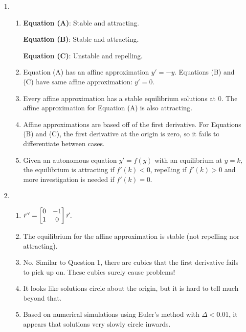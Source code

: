 \begin{enumerate}
	\item
	      \begin{enumerate}
		      \item
		            \textbf{Equation (A)}: Stable and attracting.

		            \textbf{Equation (B)}: Stable and attracting.

		            \textbf{Equation (C)}: Unstable and repelling.

				\item Equation (A) has an affine approximation $y'=-y$. Equations (B) and (C) 
					have same affine approximation: $y'=0$.
		      \item Every affine approximation has a stable equilibrium solutions at $0$. The affine approximation for Equation (A) is
			  	also attracting.
		      \item Affine approximations are based off of the first derivative. For Equations (B) and (C), the first
		            derivative at the origin is zero, so it fails to differentiate between cases.
		      \item Given an autonomous equation $y'=f(y)$ with an equilibrium at $y=k$, the equilibrium
		            is attracting if $f'(k) < 0$, repelling if $f'(k) > 0$ and more investigation is needed if $f'(k) = 0$.
	      \end{enumerate}

	\item
	      \begin{enumerate}
		      \item $\vec r\,' = \begin{bmatrix}0&-1\\1&0\end{bmatrix}\vec r$.
		      \item The equilibrium for the affine approximation is stable (not repelling nor attracting).
		      \item No. Similar to Question 1, there are cubics that the first derivative fails to pick up on. These
		            cubics surely cause problems!
		      \item It looks like solutions circle about the origin, but it is hard to tell much beyond that.
		      \item Based on numerical simulations using Euler's method with $\Delta <0.01$, it appears that solutions
		            very slowly circle inwards.


\end{enumerate}
\end{enumerate}
